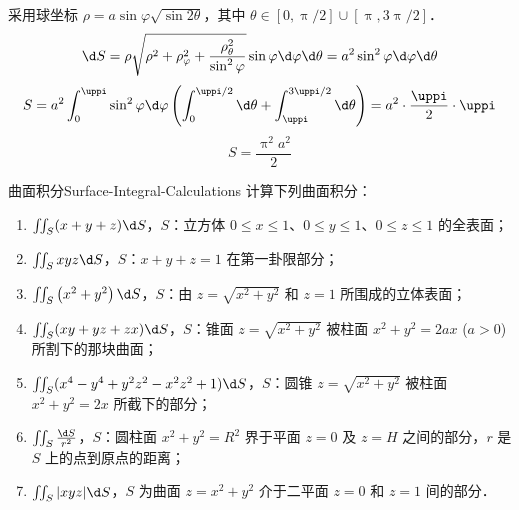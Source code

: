 \begin{solution}

    采用球坐标 $\rho = a \sin \varphi \sqrt{\sin 2\theta}$，其中 $\theta \in [0, \uppi/2] \cup [\uppi, 3\uppi/2]$．
    \begin{equation}
        \d S = \rho \sqrt{\rho^2 + \rho_\varphi^2 + \frac{\rho_\theta^2}{\sin^2 \varphi}} \sin \varphi \d \varphi \d \theta = a^2 \sin^2 \varphi \d \varphi \d \theta
    \end{equation}
    \begin{equation}
        S = a^2 \int_0^{\uppi} \sin^2 \varphi \d \varphi \left( \int_0^{\uppi/2} \d \theta + \int_{\uppi}^{3\uppi/2} \d \theta \right) = a^2 \cdot \frac{\uppi}{2} \cdot \uppi
    \end{equation}
    \begin{equation}
        \boxed{S = \frac{\uppi^2 a^2}{2}}
    \end{equation}
\end{solution}

\begin{problem}{曲面积分}{Surface-Integral-Calculations}
    计算下列曲面积分：
    \begin{enumerate}
        \item $\iint_{S}(x+y+z) \d S$，$S$：立方体 $0 \le x \le 1$、$0 \le y \le 1$、$0 \le z \le 1$ 的全表面；
        \item $\iint_{S} x y z \d S$，$S$：$x+y+z=1$ 在第一卦限部分；
        \item $\iint_{S}\left(x^{2}+y^{2}\right) \d S$，$S$：由 $z=\sqrt{x^{2}+y^{2}}$ 和 $z=1$ 所围成的立体表面；
        \item $\iint_{S}(x y+y z+z x) \d S$，$S$：锥面 $z=\sqrt{x^{2}+y^{2}}$ 被柱面 $x^{2}+y^{2}=2 a x$ ($a>0$) 所割下的那块曲面；
        \item $\iint_{S}(x^{4}-y^{4}+y^{2} z^{2}-x^{2} z^{2}+1) \d S$，$S$：圆锥 $z=\sqrt{x^{2}+y^{2}}$ 被柱面 $x^{2}+y^{2}=2 x$ 所截下的部分；
        \item $\iint_{S} \frac{\d S}{r^{2}}$，$S$：圆柱面 $x^{2}+y^{2}=R^{2}$ 界于平面 $z=0$ 及 $z=H$ 之间的部分，$r$ 是 $S$ 上的点到原点的距离；
        \item $\iint_{S}|x y z| \d S$，$S$ 为曲面 $z=x^{2}+y^{2}$ 介于二平面 $z=0$ 和 $z=1$ 间的部分．
    \end{enumerate}
\end{problem}


